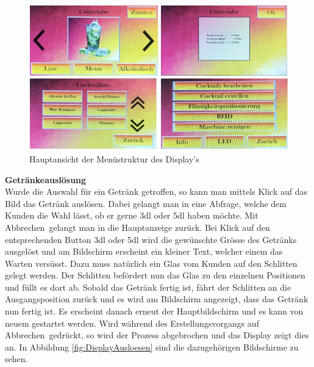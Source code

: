 \begin{figure}[H]
	\centering
	\includegraphics[width=\textwidth]{graphics/DisplayHauptmenu}
	\caption{Hauptansicht der Menüstruktur des Display's \cite{pngimgcom_cocktail_nodate-6}}
	\label{fig:DisplayHauptmenu}
\end{figure}

\textbf{Getränkeauslösung}\\
Wurde die Auswahl für ein Getränk getroffen, so kann man mittels Klick auf das Bild das Getränk auslösen. Dabei gelangt man in eine Abfrage, welche dem Kunden die Wahl lässt, ob er gerne 3dl oder 5dl haben möchte. Mit \flqq Abbrechen\frqq~gelangt man in die Hauptanzeige zurück. Bei Klick auf den entsprechenden Button 3dl oder 5dl wird die gewünschte Grösse des Getränks ausgelöst und am Bildschirm erscheint ein kleiner Text, welcher einem das Warten versüsst. Dazu muss natürlich ein Glas vom Kunden auf den Schlitten gelegt werden. Der Schlitten befördert nun das Glas zu den einzelnen Positionen und füllt es dort ab. Sobald das Getränk fertig ist, fährt der Schlitten an die Ausgangsposition zurück und es wird am Bildschirm angezeigt, dass das Getränk nun fertig ist. Es erscheint danach erneut der Hauptbildschirm und es kann von neuem gestartet werden. Wird während des Erstellungsvorgangs auf \flqq Abbrechen\frqq~gedrückt, so wird der Prozess abgebrochen und das Display zeigt dies an. In Abbildung \ref{fig:DisplayAusloesen} sind die dazugehörigen Bildschirme zu sehen.

